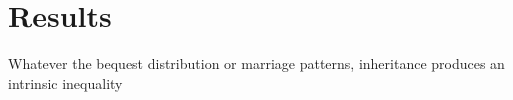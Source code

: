 \section{Results}
Whatever the bequest distribution or marriage patterns, inheritance produces an intrinsic inequality